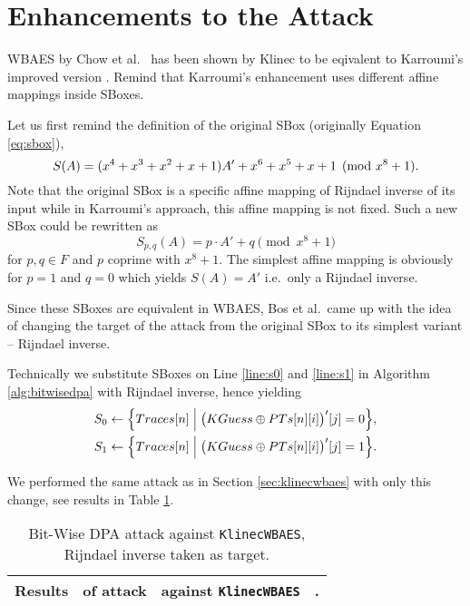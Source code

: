 \section{Enhancements to the Attack}   %

WBAES by Chow et al.\ \cite{chow2003aes} has been shown by Klinec \cite{klinec2013white} to be eqivalent to Karroumi's improved version \cite{karroumi2011protecting}. Remind that Karroumi's enhancement uses different affine mappings inside SBoxes.

Let us first remind the definition of the original SBox (originally Equation \ref{eq:sbox}),
\[
	S(A) = (x^4 + x^3 + x^2 + x + 1)A' + x^6 + x^5 + x + 1 \pmod{x^8+1} .
\]
Note that the original SBox is a specific affine mapping of Rijndael inverse of its input while in Karroumi's approach, this affine mapping is not fixed. Such a new SBox could be rewritten as
\begin{equation}
	S_{p,q}(A) = p\cdot A' + q \pmod{x^8+1}
\end{equation}
for $p,q\in F$ and $p$ coprime with $x^8+1$. The simplest affine mapping is obviously for $p=1$ and $q=0$ which yields $S(A) = A'$ i.e.\ only a Rijndael inverse.

Since these SBoxes are equivalent in WBAES, Bos et al.\ came up with the idea of changing the target of the attack from the original SBox to its simplest variant -- Rijndael inverse.

\begin{remark}
	Technically we substitute SBoxes on Line \ref{line:s0} and \ref{line:s1} in Algorithm \ref{alg:bitwisedpa} with Rijndael inverse, hence yielding
	\begin{align*}
		S_0 &\gets \Bigl\{ Traces[n] \Bigm| \bigl(KGuess\oplus PTs[n][i]\bigr)'[j] = 0 \Bigr\} , \\
		S_1 &\gets \Bigl\{ Traces[n] \Bigm| \bigl(KGuess\oplus PTs[n][i]\bigr)'[j] = 1 \Bigr\} .
	\end{align*}
\end{remark}

We performed the same attack as in Section \ref{sec:klinecwbaes} with only this change, see results in Table \ref{tab:klinecrijinv}.

\begin{table}[H]
	\begin{center}
	\begin{tabular}{| c | c | c | c |}
		\hline
		Results & of attack & against {\tt KlinecWBAES} & . \\
		\hline
	\end{tabular}
	\end{center}
\caption{Bit-Wise DPA attack against {\tt KlinecWBAES}, Rijndael inverse taken as target.}
\label{tab:klinecrijinv}
\end{table}

